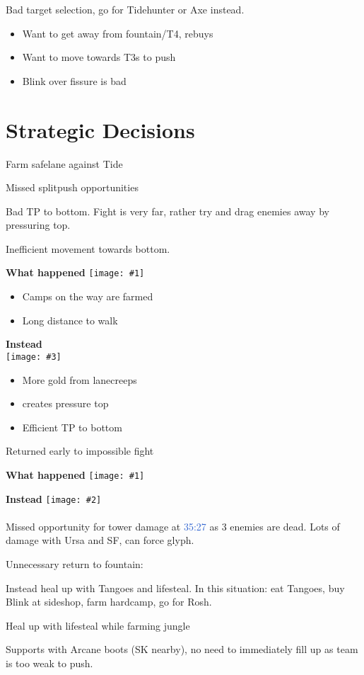 \documentclass{article}
\newcommand{\gt}{\ensuremath{\;\;\color{green} \filledmedtriangleup} }
\newcommand{\ws}{\ensuremath{\;\;\color{white} \filledmedsquare} }
\newenvironment{remarks}
    {
        \begin{description}
            \setlength\itemsep{0em}
    }
    {
        \end{description}
    }
\newcommand{\goodremark}[1]{\item[\gt] #1}
\newcommand{\neutralremark}[1]{\item[\ws] #1}
\newcommand{\logremark}[2]{\item[\textnormal{\logref{#1}}] #2}
\newcommand{\logref}[1]{\textcolor{highlight}{#1}}
\newcommand{\twominimaps}[2]{
\begin{center}
    \begin{minipage}[t]{0.3\textwidth}
        \begin{center}
            \textbf{What happened}\hfill
            \texttt{[image: \#1]}
            \end{center}
    \end{minipage}
    \begin{minipage}[t]{0.3\textwidth}
            \begin{center}
            \textbf{Instead}\hfill
        \texttt{[image: \#2]}
                \paragraph{}\hfill
            \end{center}
    \end{minipage}
\end{center}
}
\newcommand{\twominimapscomment}[4]{
\begin{center}
    \begin{minipage}[t]{0.42\textwidth}
    \begin{center}
        \textbf{What happened}\hfill
        \texttt{[image: \#1]} 
        \begin{itemize}
        #2
        \end{itemize}
    \end{center}
    \end{minipage}
    \begin{minipage}[t]{0.42\textwidth}
        \begin{center}
        \textbf{Instead}\hfill\\
        \texttt{[image: \#3]}
        \begin{itemize}
        #4
        \end{itemize}
        \end{center}
    \end{minipage} 
    \end{center}
}
\begin{document}
\begin{remarks}
\logremark{49:33}{Bad target selection, go for Tidehunter or Axe instead.
\begin{itemize}
\item Want to get away from fountain/T4, rebuys
\item Want to move towards T3s to push
\item Blink over fissure is bad
\end{itemize}
            }
\end{remarks}


\section{Strategic Decisions}
\begin{remarks}
\goodremark{Farm safelane against Tide}

\neutralremark{Missed splitpush opportunities
\begin{remarks}
\logremark{16:06}{Bad TP to bottom. Fight is very far, rather try and drag enemies away by pressuring top.}
\logremark{20:10}{ Inefficient movement towards bottom.
\twominimapscomment{img/2010bad.pdf}{\item Camps on the way are farmed \item Long distance to walk}{img/2010good.pdf}{\item More gold from lanecreeps \item creates pressure top \item Efficient TP to bottom}
}
\logremark{30:46}{ Returned early to impossible fight
\twominimaps{img/3046bad.pdf}{img/3046good.pdf} }
\end{remarks}
}

\neutralremark{Missed opportunity for tower damage at \logref{35:27} as 3 enemies are dead. Lots of damage with Ursa and SF, can force glyph.}

\neutralremark{ Unnecessary return to fountain:
\begin{remarks}
\logremark{17:07}{Instead heal up with Tangoes and lifesteal. In this situation: eat Tangoes, buy Blink at sideshop, farm hardcamp, go for Rosh.}
\logremark{23:14}{Heal up with lifesteal while farming jungle}
\logremark{26:38}{Supports with Arcane boots (SK nearby), no need to immediately fill up as team is too weak to push.}
\end{remarks}
}


\end{remarks}
\end{document}

